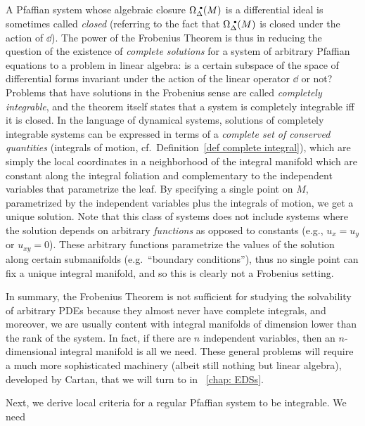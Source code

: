 \begin{rem}\label{rem: complete integrability}
    A Pfaffian system whose algebraic closure $\Omega^{\smbullet}_\Delta(M)$ is a differential ideal is sometimes called \emph{closed} (referring to the fact that $\Omega^{\smbullet}_\Delta(M)$ is closed under the action of $\dd$).
    The power of the Frobenius Theorem is thus in reducing the question of the existence of \emph{complete solutions} for a system of arbitrary Pfaffian equations to a problem in linear algebra: is a certain subspace of the space of differential forms invariant under the action of the linear operator $\dd$ or not? Problems that have solutions in the Frobenius sense are called \emph{completely integrable}, and the theorem itself states that a system is completely integrable iff it is closed. In the language of dynamical systems, solutions of completely integrable systems can be expressed in terms of a \emph{complete set of conserved quantities} (integrals of motion, cf.\ Definition~\ref{def complete integral}), which are simply the local coordinates in a neighborhood of the integral manifold which are constant along the integral foliation and complementary to the independent variables that parametrize the leaf. By specifying a single point on $M$, parametrized by the independent variables plus the integrals of motion, we get a unique solution. Note that this class of systems does not include systems where the solution depends on arbitrary \emph{functions} as opposed to constants (e.g., $u_x=u_y$ or $u_{xy}=0$). These arbitrary functions parametrize the values of the solution along certain submanifolds (e.g.~``boundary conditions''), thus no single point can fix a unique integral manifold, and so this is clearly not a Frobenius setting.
    
    In summary, the Frobenius Theorem is not sufficient for studying the solvability of arbitrary PDEs because they almost never have complete integrals, and moreover, we are usually content with integral manifolds of dimension lower than the rank of the system. In fact, if there are $n$ independent variables, then an $n$-dimensional integral manifold is all we need. These general problems will require a much more sophisticated machinery (albeit still nothing but linear algebra), developed by Cartan, that we will turn to in \Chap~\ref{chap: EDSs}.
\end{rem}

Next, we derive local criteria for a regular Pfaffian system to be integrable. We need

